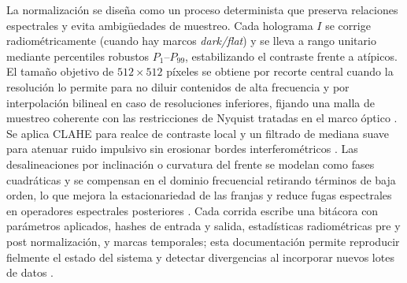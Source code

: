 La normalización se diseña como un proceso determinista que preserva relaciones espectrales y evita ambigüedades de muestreo. Cada holograma \(I\) se corrige radiométricamente (cuando hay marcos \emph{dark/flat}) y se lleva a rango unitario mediante percentiles robustos \(P_{1}\)–\(P_{99}\), estabilizando el contraste frente a atípicos. El tamaño objetivo de \(512\times512\) píxeles se obtiene por recorte central cuando la resolución lo permite para no diluir contenidos de alta frecuencia y por interpolación bilineal en caso de resoluciones inferiores, fijando una malla de muestreo coherente con las restricciones de Nyquist tratadas en el marco óptico \cite{Greenbaum2014}. Se aplica CLAHE para realce de contraste local y un filtrado de mediana suave para atenuar ruido impulsivo sin erosionar bordes interferométricos \cite{Singh2017}. Las desalineaciones por inclinación o curvatura del frente se modelan como fases cuadráticas y se compensan en el dominio frecuencial retirando términos de baja orden, lo que mejora la estacionariedad de las franjas y reduce fugas espectrales en operadores espectrales posteriores \cite{Amann2019,OConnor2020}. Cada corrida escribe una bitácora con parámetros aplicados, hashes de entrada y salida, estadísticas radiométricas pre y post normalización, y marcas temporales; esta documentación permite reproducir fielmente el estado del sistema y detectar divergencias al incorporar nuevos lotes de datos \cite{Tsamardinos2022,Vabalas2019}.

